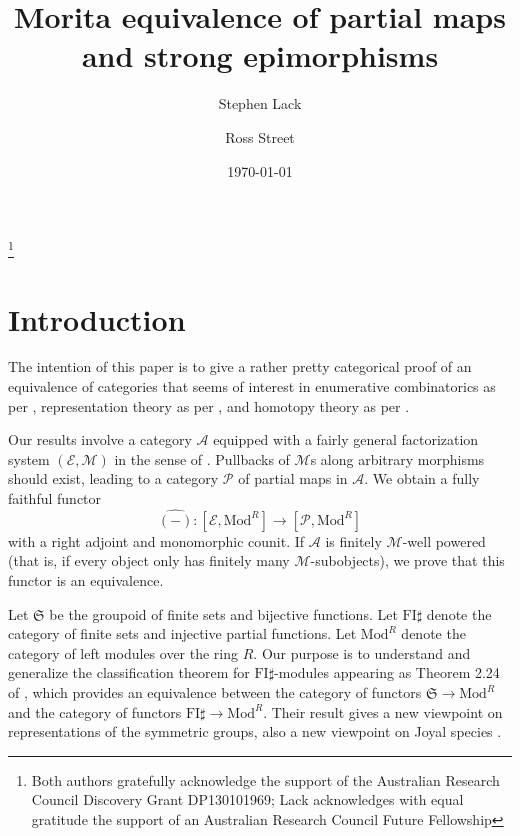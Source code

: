 \documentclass[a4paper,12pt,reqno]{amsart}
\theoremstyle{definition}
\theoremstyle{fact}
\theoremstyle{genquest}
\theoremstyle{step}
\newcommand{\lra}{\longrightarrow}
\def\CA{{\mathscr A}}
\def\CE{{\mathscr E}}
\def\CM{{\mathscr M}}
\def\CP{{\mathscr P}}
\begin{document}
\title{Morita equivalence of partial maps and strong epimorphisms}

\author{Stephen Lack}
\address{Department of Mathematics, Macquarie University, NSW 2109, Australia}

\author{Ross Street}
\address{Department of Mathematics, Macquarie University, NSW 2109, Australia}

\thanks{Both authors gratefully acknowledge the support of the Australian Research Council Discovery Grant DP130101969; Lack acknowledges with equal gratitude the support of an Australian Research Council Future Fellowship}

\date{\today}
\maketitle

\tableofcontents

\section{Introduction}

The intention of this paper is to give a rather pretty categorical proof
of an equivalence of categories that seems of interest in 
enumerative combinatorics as per \cite{Species},
representation theory as per \cite{CEF2012}, 
and homotopy theory as per \cite{Berger1996}.

Our results involve a category $\CA$ equipped with a fairly general 
factorization system $(\CE,\CM)$ in the sense of \cite{FreydKelly}.
Pullbacks of $\CM$s along arbitrary morphisms should exist, leading to
a category $\CP$ of partial maps in $\CA$. We obtain a fully faithful
functor $$\widehat{(-)} : [\CE, \mathrm{Mod}^R] \lra [\CP,\mathrm{Mod}^R]$$ 
with a right adjoint and monomorphic counit. 
If $\CA$ is finitely $\CM$-well powered
(that is, if every object only has finitely many $\CM$-subobjects), 
we prove that this functor is an equivalence.

Let $\mathfrak{S}$ be the groupoid of finite sets and bijective functions.
Let $\mathrm{FI}\sharp$ denote the category of finite sets and injective partial functions.
Let $\mathrm{Mod}^R$ denote the category of left modules over the ring $R$.
Our purpose is to understand and generalize the classification theorem for $\mathrm{FI}\sharp$-modules appearing as Theorem 2.24 of \cite{CEF2012}, which provides an equivalence between the category of functors
$\mathfrak{S} \lra \mathrm{Mod}^R$ and the category of functors
$\mathrm{FI}\sharp \lra \mathrm{Mod}^R$. 
Their result gives a new viewpoint on representations of the symmetric groups,
also a new viewpoint on Joyal species \cite{Species, AnalFunct}.
\end{document}
